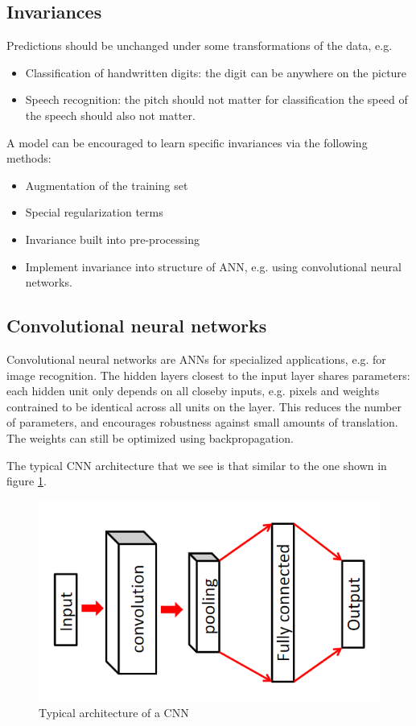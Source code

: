 \documentclass[a4paper,10pt,twoside]{article}
\begin{document}
\subsection{Invariances}
Predictions should be unchanged under some transformations of the data, e.g.
\begin{itemize}
    \item Classification of handwritten digits: the digit can be anywhere on the picture
    \item Speech recognition: the pitch should not matter for classification the speed of the speech should also not matter.
\end{itemize}
A model can be encouraged to learn specific invariances via the following methods:
\begin{itemize}
    \item Augmentation of the training set
    \item Special regularization terms
    \item Invariance built into pre-processing
    \item Implement invariance into structure of ANN, e.g. using convolutional neural networks.
\end{itemize}

\subsection{Convolutional neural networks}
Convolutional neural networks are ANNs for specialized applications, e.g. for image recognition. The hidden layers closest to the input layer shares parameters: each hidden unit only depends on all closeby inputs, e.g. pixels and weights contrained to be identical across all units on the layer. This reduces the number of parameters, and encourages robustness against small amounts of translation. The weights can still be optimized using backpropagation.

The typical CNN architecture that we see is that similar to the one shown in figure \ref{cnn-arch}.

\begin{figure}
    \centering
    \includegraphics[width=.5\textwidth]{figures/cnn-arch.png}
    \caption{Typical architecture of a CNN}
    \label{cnn-arch}
\end{figure}
\end{document}
